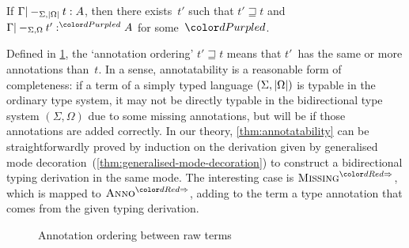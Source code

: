 \begin{proposition}[Annotatability]\label{thm:annotatability}
If $\Gamma |-_{\Sigma,\left|\Omega\right|} t : A$, then there exists~$t'$ such that $t' \sqsupseteq t$ and $\Gamma |-_{\Sigma,\Omega} t' :^\dir{d} A$ for some~$\dir{d}$.
\end{proposition}
Defined in \cref{fig:annotation-ordering}, the `annotation ordering' $t' \sqsupseteq t$ means that $t'$~has the same or more annotations than~$t$.
In a sense, annotatability is a reasonable form of completeness: if a term of a simply typed language $(\Sigma, \left|\Omega\right|)$ is typable in the ordinary type system, it may not be directly typable in the bidirectional type system $(\Sigma, \Omega)$ due to some missing annotations, but will be if those annotations are added correctly.
In our theory, \cref{thm:annotatability} can be straightforwardly proved by induction on the derivation given by generalised mode decoration~(\cref{thm:generalised-mode-decoration}) to construct a bidirectional typing derivation in the same mode.
The interesting case is $\SynRule{Missing}$, which is mapped to $\SynRule{Anno}$, adding to the term a type annotation that comes from the given typing derivation.
\begin{figure}
  \centering\small
  \caption{Annotation ordering between raw terms}
  \label{fig:annotation-ordering}
\end{figure}

